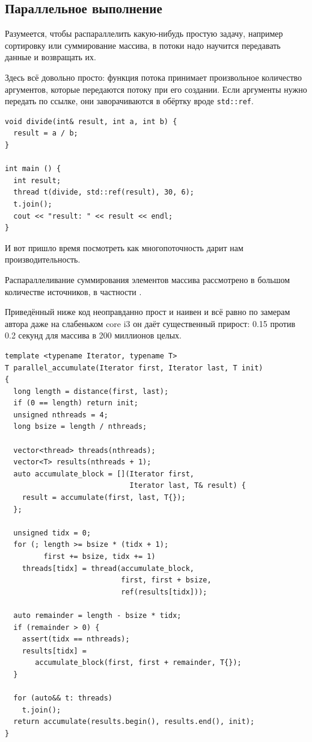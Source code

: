 \documentclass[a4paper,12pt,oneside]{book}
\begin{document}
\subsection{Параллельное выполнение}\label{sub:parallel}

Разумеется, чтобы распараллелить какую-нибудь простую задачу, например сортировку или суммирование массива, в потоки надо научится передавать данные и возвращать их.

Здесь всё довольно просто: функция потока принимает произвольное количество аргументов, которые передаются потоку при его создании. Если аргументы нужно передать по ссылке, они заворачиваются в обёртку вроде \lstinline!std::ref!.

\begin{lstlisting}
void divide(int& result, int a, int b) {
  result = a / b;
}

int main () {
  int result;
  thread t(divide, std::ref(result), 30, 6);
  t.join();
  cout << "result: " << result << endl;
}
\end{lstlisting}

И вот пришло время посмотреть как многопоточность дарит нам производительность.

Распараллеливание суммирования элементов массива рассмотрено в большом количестве источников, в частности \cite{williams}. 

Приведённый ниже код неоправданно прост и наивен и всё равно по замерам автора даже на слабеньком core i3 он даёт существенный прирост: 0.15 против 0.2 секунд для массива в 200 миллионов целых.

\begin{lstlisting}
template <typename Iterator, typename T>
T parallel_accumulate(Iterator first, Iterator last, T init)
{
  long length = distance(first, last);
  if (0 == length) return init;
  unsigned nthreads = 4;
  long bsize = length / nthreads;

  vector<thread> threads(nthreads);
  vector<T> results(nthreads + 1);
  auto accumulate_block = [](Iterator first, 
                             Iterator last, T& result) {
    result = accumulate(first, last, T{});
  };

  unsigned tidx = 0;
  for (; length >= bsize * (tidx + 1);  
         first += bsize, tidx += 1)
    threads[tidx] = thread(accumulate_block, 
                           first, first + bsize, 
                           ref(results[tidx]));  

  auto remainder = length - bsize * tidx;
  if (remainder > 0) {
    assert(tidx == nthreads);
    results[tidx] = 
       accumulate_block(first, first + remainder, T{});
  }

  for (auto&& t: threads) 
    t.join();
  return accumulate(results.begin(), results.end(), init);
}
\end{lstlisting}
\end{document}
